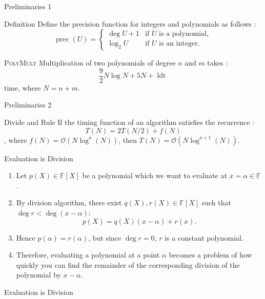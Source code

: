 \begin{frame}{Preliminaries 1}
    \begin{block}{Definition}
        Define the precision function for integers and polynomials as follows :
        \[\operatorname{prec}(U) = \begin{cases}\deg{U} + 1 & \text{if $U$ is a polynomial}, \\ \log_2 U & \text{if $U$ is an integer}.\end{cases}\]
    \end{block}

    \begin{block}{\textsc{PolyMult}}
        Multiplication of two polynomials of degree $n$ and $m$ takes : 
        \[\frac{9}{2} N \log{N} + 5N + \operatorname{ldt}\] time, where $N=n+m$.
    \end{block} 
\end{frame}
\begin{frame}{Preliminaries 2}
    \begin{block}{Divide and Rule}
        If the timing function of an algorithm satisfies the recurrence : 
        \[T(N) = 2T(N/2) + f(N)\],
        where $f(N) = \mathcal{O}(N\log^{a}(N))$, then $T(N) = \mathcal{O}(N\log^{a+1}(N))$.
    \end{block}
\end{frame}

\begin{frame}{Evaluation is Division}
    \begin{enumerate}
        \item Let $p(X) \in \mathbb{F}[X]$ be a polynomial which we want to evaluate at $x=\alpha \in \mathbb{F}$.
        \item By division algorithm, there exist $q(X), r(X)\in \mathbb{F}[X]$ such that $\deg{r}<\deg(x-\alpha)$: 
        \[p(X) = q(X)(x-\alpha) + r(x).\]
        \item Hence $p(\alpha) = r(\alpha)$, but since $\deg{r} = 0$, $r$ is a constant polynomial.
        \item Therefore, evaluating a polynomial at a point $\alpha$ becomes a problem of how quickly you can find the remainder of the corresponding division of the polynomial by $x-\alpha$.
    \end{enumerate}
\end{frame}

\begin{frame}{Evaluation is Division}
\end{frame}

